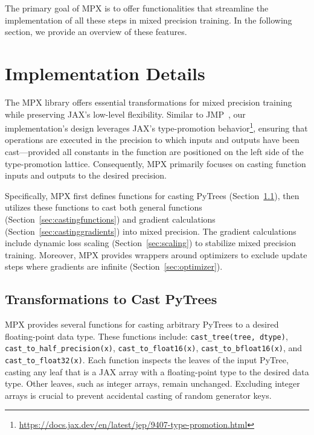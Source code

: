 \documentclass[logo]{dsme}
\newcommand{\mpx}{\textsc{MPX}}
\begin{document}
The primary goal of \mpx{} is to offer functionalities that streamline the implementation of all these steps in mixed precision training. 
In the following section, we provide an overview of these features.

\section{Implementation Details}

The \mpx{} library offers essential transformations for mixed precision training while preserving JAX's low-level flexibility. 
Similar to JMP~\citep{jmp}, our implementation's design leverages JAX's type-promotion behavior\footnote{\url{https://docs.jax.dev/en/latest/jep/9407-type-promotion.html}}, ensuring that operations are executed in the precision to which inputs and outputs have been cast—provided all constants in the function are positioned on the left side of the type-promotion lattice. 
Consequently, \mpx{} primarily focuses on casting function inputs and outputs to the desired precision.

Specifically, \mpx{} first defines functions for casting PyTrees (Section~\ref{sec:castingpytrees}), then utilizes these functions to cast both general functions (Section~\ref{sec:castingfunctions}) and gradient calculations (Section~\ref{sec:castinggradients}) into mixed precision. 
The gradient calculations include dynamic loss scaling (Section~\ref{sec:scaling}) to stabilize mixed precision training.
Moreover, \mpx{} provides wrappers around optimizers to exclude update steps where gradients are infinite (Section~\ref{sec:optimizer}).

\subsection{Transformations to Cast PyTrees}
\label{sec:castingpytrees}

\mpx{} provides several functions for casting arbitrary PyTrees to a desired floating-point data type. These functions include:
\texttt{cast\_tree(tree, dtype)}, \texttt{cast\_to\_half\_precision(x)}, \texttt{cast\_to\_float16(x)}, \texttt{cast\_to\_bfloat16(x)}, and \texttt{cast\_to\_float32(x)}. 
Each function inspects the leaves of the input PyTree, casting any leaf that is a JAX array with a floating-point type to the desired data type. 
Other leaves, such as integer arrays, remain unchanged. 
Excluding integer arrays is crucial to prevent accidental casting of random generator keys.
\end{document}
